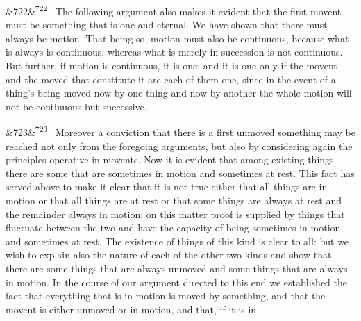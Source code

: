 \documentclass[12pt]{article}
\newcommand{\para}[1][]{\par\noindent\ifx&#1&\else\textsuperscript{\footnotesize #1}~\fi}
\begin{document}
\para[722] The following argument also makes it evident that the first movent must be something that is one and eternal. We have shown that there must always be motion. That being so, motion must also be continuous, because what is always is continuous, whereas what is merely in succession is not continuous. But further, if motion is continuous, it is one: and it is one only if the movent and the moved that constitute it are each of them one, since in the event of a thing's being moved now by one thing and now by another the whole motion will not be continuous but successive.

\para[723] Moreover a conviction that there is a first unmoved something may be reached not only from the foregoing arguments, but also by considering again the principles operative in movents. Now it is evident that among existing things there are some that are sometimes in motion and sometimes at rest. This fact has served above to make it clear that it is not true either that all things are in motion or that all things are at rest or that some things are always at rest and the remainder always in motion: on this matter proof is supplied by things that fluctuate between the two and have the capacity of being sometimes in motion and sometimes at rest. The existence of things of this kind is clear to all: but we wish to explain also the nature of each of the other two kinds and show that there are some things that are always unmoved and some things that are always in motion. In the course of our argument directed to this end we established the fact that everything that is in motion is moved by something, and that the movent is either unmoved or in motion, and that, if it is in
\end{document}
